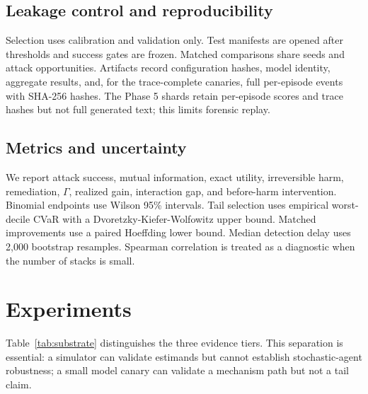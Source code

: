 \documentclass[10pt]{article}
\begin{document}
\subsection{Leakage control and reproducibility}
Selection uses calibration and validation only. Test manifests are opened after thresholds and success gates are frozen. Matched comparisons share seeds and attack opportunities. Artifacts record configuration hashes, model identity, aggregate results, and, for the trace-complete canaries, full per-episode events with SHA-256 hashes. The Phase 5 shards retain per-episode scores and trace hashes but not full generated text; this limits forensic replay.

\subsection{Metrics and uncertainty}
We report attack success, mutual information, exact utility, irreversible harm, remediation, $\Gamma$, realized gain, interaction gap, and before-harm intervention. Binomial endpoints use Wilson 95\% intervals. Tail selection uses empirical worst-decile CVaR with a Dvoretzky-Kiefer-Wolfowitz upper bound. Matched improvements use a paired Hoeffding lower bound. Median detection delay uses 2,000 bootstrap resamples. Spearman correlation is treated as a diagnostic when the number of stacks is small.

\section{Experiments}
Table~\ref{tab:substrate} distinguishes the three evidence tiers. This separation is essential: a simulator can validate estimands but cannot establish stochastic-agent robustness; a small model canary can validate a mechanism path but not a tail claim.
\end{document}
